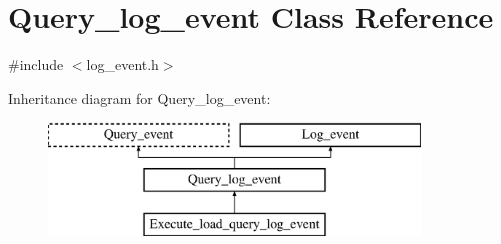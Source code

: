\hypertarget{classQuery__log__event}{}\section{Query\+\_\+log\+\_\+event Class Reference}
\label{classQuery__log__event}


{\ttfamily \#include $<$log\+\_\+event.\+h$>$}

Inheritance diagram for Query\+\_\+log\+\_\+event\+:\begin{figure}[H]
\begin{center}
\leavevmode
\includegraphics[height=3.000000cm]{classQuery__log__event}
\end{center}
\end{figure}
